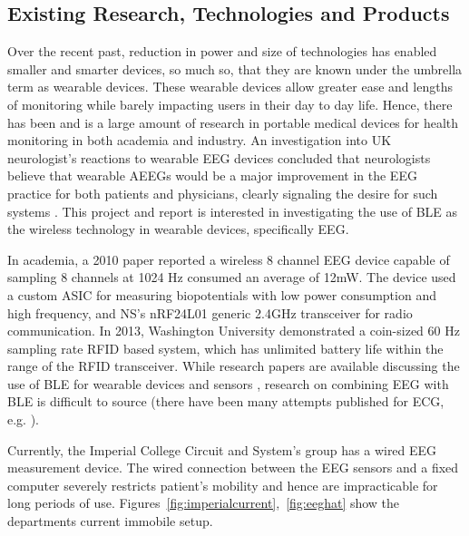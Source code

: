 \documentclass[]{article}
\begin{document}
\subsection{Existing Research, Technologies and Products}

Over the recent past, reduction in power and size of technologies has enabled smaller and smarter devices, so much so, that they are known under the umbrella term as wearable devices. These wearable devices allow greater ease and lengths of monitoring  while barely impacting users in their day to day life. Hence, there has been and is a large amount of research in portable medical devices for health monitoring in both academia and industry. An investigation  into UK neurologist's reactions to wearable \ac{EEG} devices concluded that neurologists believe that wearable \ac{AEEG}s would be a major improvement in the \ac{EEG} practice for both patients and physicians, clearly signaling the desire for such systems \cite{asson2008}. This project and report is interested in investigating the use of \ac{BLE} as the wireless technology in wearable devices, specifically \ac{EEG}.

In academia, a 2010  paper reported a wireless 8 channel \ac{EEG} device capable of sampling 8 channels at 1024 Hz consumed an average of 12mW\cite{Brown2010}. The device used a custom \ac{ASIC} for measuring biopotentials with low power consumption and high frequency, and \ac{NS}'s nRF24L01 generic 2.4GHz transceiver for radio communication. In 2013, Washington University \cite{Dementyev2013} demonstrated a coin-sized 60 Hz sampling rate \ac{RFID} based system, which has unlimited battery life within the range of the \ac{RFID} transceiver.  While research papers are available discussing the use of \ac{BLE} for wearable devices and sensors \cite{Omre2010} \cite{MacKensen2012}, research on combining \ac{EEG} with \ac{BLE} is difficult to source (there have been many attempts published for \ac{ECG}, e.g. \cite{Yu2012}).

Currently, the Imperial College Circuit and System's group has a wired \ac{EEG} measurement device. The wired connection between the \ac{EEG} sensors and a fixed computer severely restricts patient's mobility and hence are impracticable for long periods of use. Figures~\ref{fig:imperialcurrent},~\ref{fig:eeghat} show the departments current immobile setup. 
\end{document}
